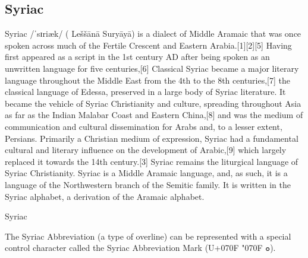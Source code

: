 \subsection{Syriac}

\newfontfamily{}

Syriac /ˈsɪriæk/ ({} Leššānā Suryāyā) is a dialect of Middle Aramaic that was once spoken across much of the Fertile Crescent and Eastern Arabia.[1][2][5] Having first appeared as a script in the 1st century AD after being spoken as an unwritten language for five centuries,[6] Classical Syriac became a major literary language throughout the Middle East from the 4th to the 8th centuries,[7] the classical language of Edessa, preserved in a large body of Syriac literature.
It became the vehicle of Syriac Christianity and culture, spreading throughout Asia as far as the Indian Malabar Coast and Eastern China,[8] and was the medium of communication and cultural dissemination for Arabs and, to a lesser extent, Persians. Primarily a Christian medium of expression, Syriac had a fundamental cultural and literary influence on the development of Arabic,[9] which largely replaced it towards the 14th century.[3] Syriac remains the liturgical language of Syriac Christianity.
Syriac is a Middle Aramaic language, and, as such, it is a language of the Northwestern branch of the Semitic family. It is written in the Syriac alphabet, a derivation of the Aramaic alphabet.

\begin{scriptexample}[]{Syriac}
\end{scriptexample}

The Syriac Abbreviation (a type of overline) can be represented with a special control character called the Syriac Abbreviation Mark (U+070F {\syriac \char"070F ܘ}).